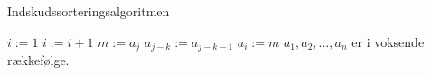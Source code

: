 \begin{algorithm}
\caption{Indskudssorteringsalgoritmen}
\begin{algorithmic}[1]

\EndProcedure
{}
	\State $i:=1$
    		\State $i:=i+1$
    	\EndWhile
    	\State $m:=a_{j}$
    		\State $a_{j-k}:=a_{j-k-1}$
    	\EndFor
    	\State $a_{i}:=m$
\EndFor
\State $a_{1},a_{2},\dotsc,a_{n}$ er i voksende rækkefølge. 

\end{algorithmic}
\end{algorithm}

